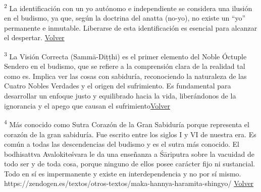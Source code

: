 \documentclass[
  a5paperpaper,
]{article}
\begin{document}
\textsuperscript{2} La identificación con un yo autónomo e independiente
se considera una ilusión en el budismo, ya que, según la doctrina del
anatta (no-yo), no existe un ``yo'' permanente e inmutable. Liberarse de
esta identificación es esencial para alcanzar el despertar.
\protect\hyperlink{ref2}{Volver}

\textsuperscript{3} La Visión Correcta (Sammā-Diṭṭhi) es el primer
elemento del Noble Óctuple Sendero en el budismo, que se refiere a la
comprensión clara de la realidad tal como es. Implica ver las cosas con
sabiduría, reconociendo la naturaleza de las Cuatro Nobles Verdades y el
origen del sufrimiento. Es fundamental para desarrollar un enfoque justo
y equilibrado hacia la vida, liberándonos de la ignorancia y el apego
que causan el sufrimiento\protect\hyperlink{ref3}{Volver}

\textsuperscript{4} Más conocido como Sutra Corazón de la Gran Sabiduría
porque representa el corazón de la gran sabiduría. Fue escrito entre los
siglos I y VI de nuestra era. Es común a todas las descendencias del
budismo y es el sutra más conocido. El bodhisattva Avalokiteśvara le da
una enseñanza a Śāriputra sobre la vacuidad de todo ser y de toda cosa,
porque ninguno de ellos posee carácter fijo ni sustancial. Todo en sí es
impermanente y existe en interdependencia y no por sí mismo.
https://zendogen.es/textos/otros-textos/maka-hannya-haramita-shingyo/
\protect\hyperlink{ref4}{Volver}

\hfill\break
\end{document}
